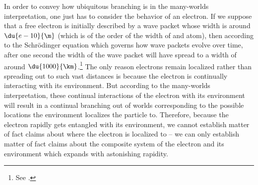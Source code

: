 \documentclass[12pt]{report}
\begin{document}
       In order to convey how ubiquitous branching is in the many-worlds interpretation, one just has to consider the behavior of an electron. If we suppose that a free electron \label{electronspread} is initially described by a wave packet whose width is around $\du{e-10}{\m}$  (which is of the order of the width of and atom), then according to the Schr\"{o}dinger equation which governs how wave packets evolve over time, after one second the width of the wave packet will have spread to a width of around $\du{1000}{\km}$.\footnote{See \cite[117]{Schlosshauer}.} The only reason electrons remain localized rather than spreading out to such vast distances is because the electron is continually interacting with its environment.  But according to the many-worlds interpretation, these continual interactions of the electron with its environment will result in a continual branching out of worlds corresponding to the possible locations the environment localizes the particle to. Therefore, because the electron rapidly gets entangled with its environment, we cannot establish matter of fact claims about where the electron is localized to -- we can only establish matter of fact claims about the composite system of the electron and its environment which expands with astonishing rapidity.     
       
\end{document}
